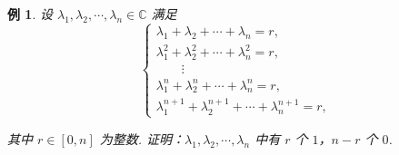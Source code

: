 \documentclass[10pt,openany]{article}
\theoremstyle{thmstyle} %
\theoremstyle{defstyle} %
\theoremstyle{prostyle} %
\theoremstyle{exastyle}
\newtheorem{example}[theorem]{例}
\theoremstyle{remstyle}
\newcommand{\C}{\mathbb{C}}
\begin{document}
\begin{example} \label{4.1.14}
	设 \( \lambda_1,\lambda_2,\cdots,\lambda_n \in \C \) 满足
	\[ \left\{ \begin{array}{l}
		\lambda_1+\lambda_2+\cdots+\lambda_n = r,\\
		\lambda_1^{2}+\lambda_2^{2}+\cdots+\lambda_n^{2} = r,\\
		\qquad \vdots\\
		\lambda_1^{n}+\lambda_2^{n}+\cdots+\lambda_n^{n} = r,\\
		\lambda_1^{n+1}+\lambda_2^{n+1}+\cdots+\lambda_n^{n+1} = r,
	\end{array}\right.\]
	
	其中 \( r \in [0,n] \) 为整数. 证明：\( \lambda_1,\lambda_2,\cdots,\lambda_n \) 中有 \( r \) 个 \( 1 \)，\( n-r \) 个 \( 0 \).
\end{example}
\end{document}
